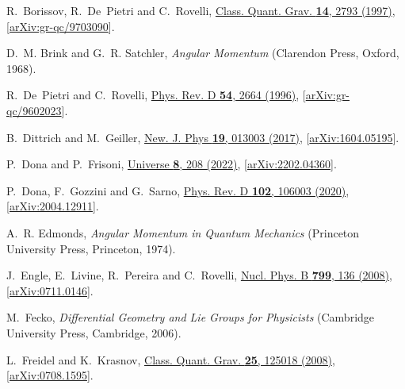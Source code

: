 \documentclass[graybox, secnum]{svmult}
\begin{document}
\begin{thebibliography}{99}
R.~Borissov, R.~De~Pietri and C.~Rovelli, %
  \href{http://dx.doi.org/10.1088/0264-9381/14/10/008}{Class. Quant. Grav.
  {\bfseries 14}, 2793 (1997)},
  [\href{http://arxiv.org/abs/gr-qc/9703090}{arXiv:gr-qc/9703090}].

D.~M. Brink and G.~R. Satchler, {\em Angular Momentum}
  (Clarendon Press, Oxford, 1968).

R.~De~Pietri and C.~Rovelli, %
  \href{http://dx.doi.org/10.1103/PhysRevD.54.2664}{Phys. Rev. D {\bfseries
  54}, 2664 (1996)},
  [\href{http://arxiv.org/abs/gr-qc/9602023}{arXiv:gr-qc/9602023}].

B.~Dittrich and M.~Geiller,
  \href{https://doi.org/10.1088/1367-2630/aa54e2}{New. J. Phys
  {\bfseries 19}, 013003 (2017)},
  [\href{http://arxiv.org/abs/1604.05195}{arXiv:1604.05195}].

P.~Dona and P.~Frisoni, %
  \href{https://doi.org/10.3390/universe8040208}{Universe {\bfseries
  8}, 208 (2022)},
  [\href{http://arxiv.org/abs/2202.04360}{arXiv:2202.04360}].

P.~Dona, F.~Gozzini and G.~Sarno, %
  \href{https://doi.org/10.1103/PhysRevD.102.106003}{Phys. Rev. D {\bfseries
  102}, 106003 (2020)},
  [\href{http://arxiv.org/abs/2004.12911}{arXiv:2004.12911}].

A.~R. Edmonds, {\em Angular Momentum in Quantum Mechanics}
  (Princeton University Press, Princeton, 1974).

J.~Engle, E.~Livine, R.~Pereira and C.~Rovelli, %
  \href{http://dx.doi.org/10.1016/j.nuclphysb.2008.02.018}{Nucl. Phys. B
  {\bfseries 799}, 136 (2008)},
  [\href{http://arxiv.org/abs/0711.0146}{arXiv:0711.0146}].

M.~Fecko, {\em Differential Geometry and Lie Groups for Physicists}
  (Cambridge University Press, Cambridge, 2006).

L.~Freidel and K.~Krasnov, %
  \href{http://dx.doi.org/10.1088/0264-9381/25/12/125018}{Class. Quant. Grav.
  {\bfseries 25}, 125018 (2008)},
  [\href{http://arxiv.org/abs/0708.1595}{arXiv:0708.1595}].


\end{thebibliography}
\end{document}
